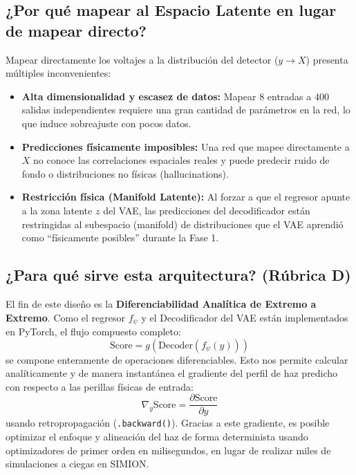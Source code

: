 \documentclass[12pt,letterpaper]{article}
\begin{document}
\subsection{¿Por qué mapear al Espacio Latente en lugar de mapear directo?}
Mapear directamente los voltajes a la distribución del detector ($y \to X$) presenta múltiples inconvenientes:
\begin{itemize}
    \item \textbf{Alta dimensionalidad y escasez de datos:} Mapear 8 entradas a 400 salidas independientes requiere una gran cantidad de parámetros en la red, lo que induce sobreajuste con pocos datos.
    \item \textbf{Predicciones físicamente imposibles:} Una red que mapee directamente a $X$ no conoce las correlaciones espaciales reales y puede predecir ruido de fondo o distribuciones no físicas (hallucinations).
    \item \textbf{Restricción física (Manifold Latente):} Al forzar a que el regresor apunte a la zona latente $z$ del VAE, las predicciones del decodificador están restringidas al subespacio (manifold) de distribuciones que el VAE aprendió como ``físicamente posibles'' durante la Fase 1.
\end{itemize}

\subsection{¿Para qué sirve esta arquitectura? (Rúbrica D)}
El fin de este diseño es la \textbf{Diferenciabilidad Analítica de Extremo a Extremo}. Como el regresor $f_\psi$ y el Decodificador del VAE están implementados en PyTorch, el flujo compuesto completo:
\begin{equation}
    \text{Score} = g(\text{Decoder}(f_\psi(y)))
\end{equation}
se compone enteramente de operaciones diferenciables. Esto nos permite calcular analíticamente y de manera instantánea el gradiente del perfil de haz predicho con respecto a las perillas físicas de entrada:
\begin{equation}
    \nabla_y \text{Score} = \frac{\partial \text{Score}}{\partial y}
\end{equation}
usando retropropagación (\texttt{.backward()}). Gracias a este gradiente, es posible optimizar el enfoque y alineación del haz de forma determinista usando optimizadores de primer orden en milisegundos, en lugar de realizar miles de simulaciones a ciegas en SIMION.
\end{document}
